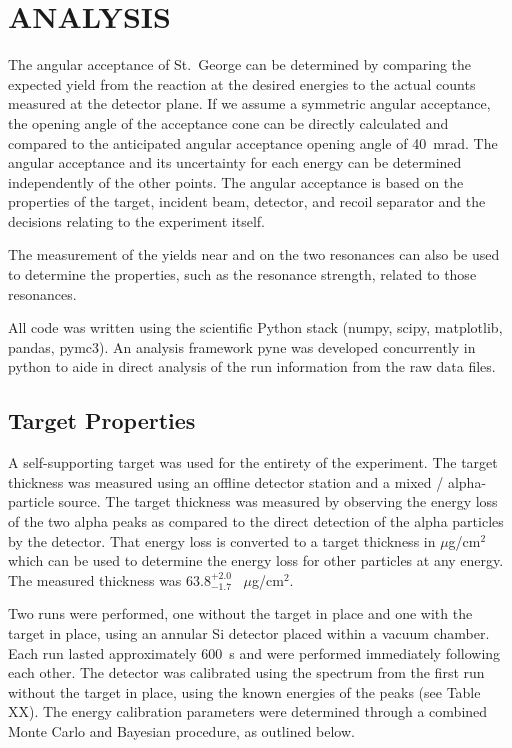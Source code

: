
\chapter{ANALYSIS}
\label{ch:analysis}

The angular acceptance of St.\ George can be determined by comparing the
expected yield from the reaction at the desired energies to the actual
counts measured at the detector plane. If we assume a symmetric angular
acceptance, the opening angle of the acceptance cone can be directly
calculated and compared to the anticipated angular acceptance opening
angle of 40~mrad. The angular acceptance and its uncertainty for each
energy can be determined independently of the other points. The angular
acceptance is based on the properties of the target, incident beam,
detector, and recoil separator and the decisions relating to the
experiment itself.

The measurement of the yields near and on the two resonances can also be used
to determine the properties, such as the resonance strength, related to those
resonances.

All code was written using the scientific Python stack (numpy, scipy,
matplotlib, pandas, pymc3). An analysis framework pyne was developed
concurrently in python to aide in direct analysis of the run information
from the raw data files.


\section{Target Properties}
\label{sec:target-properties}

A self-supporting  target was used for the entirety of the
experiment. The target thickness was measured using an offline detector
station and a mixed / alpha-particle source. The
target thickness was measured by observing the energy loss of the two
alpha peaks as compared to the direct detection of the alpha particles
by the detector. That energy loss is converted to a target thickness in
$\mu$g/cm${}^{2}$ which can be used to determine the energy loss for other
particles at any energy. The measured thickness was $63.8^{+2.0}_{-1.7}$~
$\mu$g/cm${}^{2}$.


Two runs were performed, one without the target in place and one with
the target in place, using an annular Si detector placed within a vacuum
chamber. Each run lasted approximately 600~s and were performed
immediately following each other. The detector was calibrated using the
spectrum from the first run without the target in place, using the known
energies of the peaks (see Table XX). The energy calibration parameters
were determined through a combined Monte Carlo and Bayesian procedure, as
outlined below.

